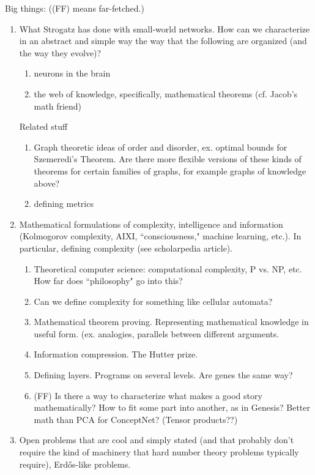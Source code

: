 Big things: ((FF) means far-fetched.)
\begin{enumerate}
\item
What Strogatz has done with small-world networks. How can we characterize in an abstract and simple way the way that the following are organized (and the way they evolve)?
\begin{enumerate}
\item neurons in the brain
\item the web of knowledge, specifically, mathematical theorems (cf. Jacob's math friend)
\end{enumerate}
Related stuff
\begin{enumerate}
\item Graph theoretic ideas of order and disorder, ex. optimal bounds for Szemeredi's Theorem. Are there more flexible versions of these kinds of theorems for certain families of graphs, for example graphs of knowledge above?
\item defining metrics
\end{enumerate}
\item 
Mathematical formulations of complexity, intelligence and information (Kolmogorov complexity, AIXI, ``consciousness," machine learning, etc.). In particular, defining complexity (see scholarpedia article).
\begin{enumerate}
\item Theoretical computer science: computational complexity, P vs. NP, etc. How far does ``philosophy" go into this?
\item Can we define complexity for something like cellular automata?
\item Mathematical theorem proving. Representing mathematical knowledge in useful form. (ex. analogies, parallels between different arguments.
\item Information compression. The Hutter prize.
\item Defining layers. Programs on several levels. Are genes the same way?
\item (FF)
Is there a way to characterize what makes a good story mathematically? How to fit some part into another, as in Genesis? Better math than PCA for ConceptNet?
(Tensor products??)
\end{enumerate}
\item Open problems that are cool and simply stated (and that probably don't require the kind of machinery that hard number theory problems typically require), Erd\H os-like problems.
\begin{enumerate}

\end{enumerate}
\end{enumerate}
